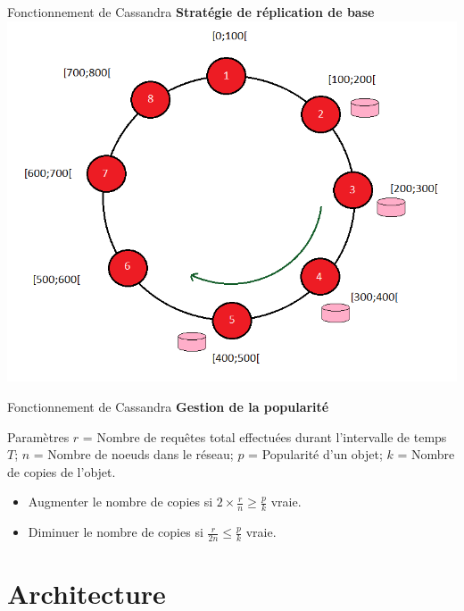 \documentclass{beamer}
\newcommand{\fail}{\color{FailedRed}\XSolidBold}
\begin{document}
\begin{frame}{Fonctionnement de Cassandra}
\textbf{Stratégie de réplication de base}
\centering
    \includegraphics[scale=0.4]{replication}
\end{frame}

\begin{frame}{Fonctionnement de Cassandra}
\textbf{Gestion de la popularité} \fail
\begin{block}{Paramètres}
    $r$ = Nombre de requêtes total effectuées durant l'intervalle de temps $T$; \newline
    $n$ = Nombre de noeuds dans le réseau; \newline
    $p$ = Popularité d'un objet; \newline
    $k$ = Nombre de copies de l'objet.
\end{block}

\begin{itemize}
    \item Augmenter le nombre de copies si $ 2 \times \frac{r}{n} \geq \frac{p}{k} $ vraie.
    \item Diminuer le nombre de copies si $ \frac{r}{2n} \leq \frac{p}{k} $ vraie.
\end{itemize}
\end{frame}


\section{Architecture}
\end{document}
